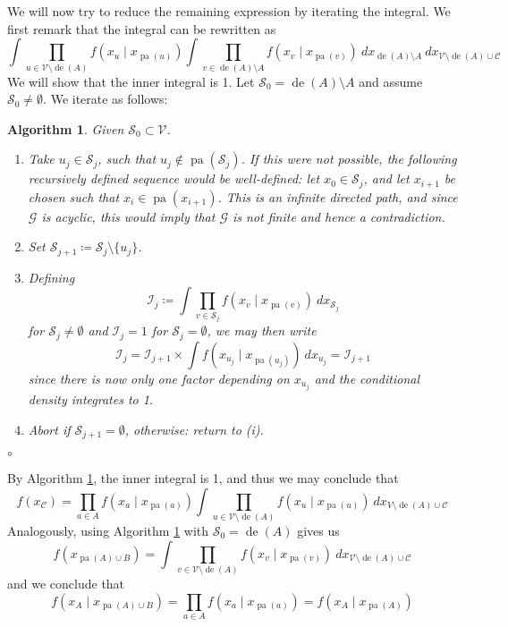 \documentclass[11pt, a4paper]{memoir}
\theoremstyle{break}
\theoremstyle{break}
\newtheorem{inneralg}{Algorithm}
\newenvironment{alg}{\begin{inneralg}}{\ensuremath{\circ}\end{inneralg}}
\theoremstyle{nonumberplain}
\DeclareMathOperator{\pa}{pa}
\DeclareMathOperator{\de}{de}
\begin{document}
We will now try to reduce the remaining expression by iterating the integral. We first remark that the integral can be rewritten as
$$\int \prod_{u\in \mathcal{V}\setminus \de(A)} f\left(x_u\mid x_{\pa(u)}\right) \int \prod_{v\in \de(A)\setminus A} f\left(x_v\mid x_{\pa(v)}\right)\ dx_{\de(A)\setminus A}\ dx_{\mathcal{V}\setminus \de(A)\cup \mathcal{C}}$$
We will show that the inner integral is 1. Let $\mathcal{S}_0=\de(A)\setminus A$ and assume $\mathcal{S}_0\neq\emptyset$. We iterate as follows:
\begin{alg}\label{alg1}
Given $\mathcal{S}_0\subset \mathcal{V}$.
\begin{enumerate}[label=(\roman*)]
	\item Take $u_j\in \mathcal{S}_j$, such that $u_j\not\in \pa\left(\mathcal{S}_j\right)$. If this were not possible, the following recursively defined sequence would be well-defined: let $x_0\in \mathcal{S}_j$, and let $x_{i+1}$ be chosen such that $x_i\in \pa(x_{i+1})$. This is an infinite directed path, and since $\mathcal{G}$ is acyclic, this would imply that $\mathcal{G}$ is not finite and hence a contradiction.
	\item Set $\mathcal{S}_{j+1}\coloneqq\mathcal{S}_j\setminus \{u_j\}$.  
	\item Defining
$$\mathcal{I}_{j}\coloneqq \int\prod_{v\in \mathcal{S}_j} f\left(x_v\mid x_{\pa(v)}\right)\ dx_{\mathcal{S}_j}$$
for $ \mathcal{S}_j\neq \emptyset$ and $\mathcal{I}_j=1$ for $\mathcal{S}_j= \emptyset$, we may then write
	$$\mathcal{I}_{j}=\mathcal{I}_{j+1}\times \int f\left(x_{u_j}\mid x_{\pa(u_j)}\right)\ dx_{u_j}=\mathcal{I}_{j+1}$$
	since there is now only one factor depending on $x_{u_j}$ and the conditional density integrates to 1.
	\item Abort if $\mathcal{S}_{j+1}=\emptyset$, otherwise: return to (i).
\end{enumerate}
\end{alg}
By Algorithm \ref{alg1}, the inner integral is 1, and thus we may conclude that
$$f(x_{\mathcal{C}})=\prod_{a\in A}f\left(x_a\mid x_{\pa(a)}\right)\int \prod_{u\in \mathcal{V}\setminus \de(A)} f\left(x_u\mid x_{\pa(u)}\right)\ dx_{V\setminus \de(A)\cup \mathcal{C}}$$
Analogously, using Algorithm \ref{alg1} with $\mathcal{S}_0=\de(A)$ gives us
$$
f(x_{\pa(A)\cup B})=\int \prod_{v\in \mathcal{V}\setminus\de(A)} f\left(x_v\mid x_{\pa(v)}\right)\ dx_{\mathcal{V}\setminus \de(A)\cup \mathcal{C}}
$$
and we conclude that
$$f\left(x_{A}\mid x_{\pa(A)\cup B}\right)=\prod_{a\in A} f\left(x_{a}\mid x_{\pa(a)}\right)=f\left(x_A\mid x_{\pa(A)}\right)$$
\end{document}
